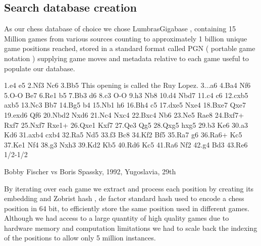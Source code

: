 \subsection{Search database creation}

As our chess database of choice we chose LumbrasGigabase \cite{retrieval:lumbrasgigabase}, containing 15 Million games from various sources counting
to approximately 1 billion unique game positions reached, stored in a standard format called PGN ( portable game notation ) \cite{chess:pgn} supplying 
game moves and metadata relative to each game useful to populate our database.
\newline

\begin{mdframed}
\newline
{}\newline
\string[Date "1992.11.04"]\string\newline
{}\newline
{}\newline
{}\newline
{}\newline
\newline
1.e4 e5 2.Nf3 Nc6 3.Bb5 {This opening is called the Ruy Lopez.} 3...a6
4.Ba4 Nf6 5.O-O Be7 6.Re1 b5 7.Bb3 d6 8.c3 O-O 9.h3 Nb8 10.d4 Nbd7
11.c4 c6 12.cxb5 axb5 13.Nc3 Bb7 14.Bg5 b4 15.Nb1 h6 16.Bh4 c5 17.dxe5
Nxe4 18.Bxe7 Qxe7 19.exd6 Qf6 20.Nbd2 Nxd6 21.Nc4 Nxc4 22.Bxc4 Nb6
23.Ne5 Rae8 24.Bxf7+ Rxf7 25.Nxf7 Rxe1+ 26.Qxe1 Kxf7 27.Qe3 Qg5 28.Qxg5
hxg5 29.b3 Ke6 30.a3 Kd6 31.axb4 cxb4 32.Ra5 Nd5 33.f3 Bc8 34.Kf2 Bf5
35.Ra7 g6 36.Ra6+ Kc5 37.Ke1 Nf4 38.g3 Nxh3 39.Kd2 Kb5 40.Rd6 Kc5 41.Ra6
Nf2 42.g4 Bd3 43.Re6 1/2-1/2
\end{mdframed}
\begin{center}
Bobby Fischer vs Boris Spassky, 1992, Yugoslavia, 29th
\end{center}
By iterating over each game we extract and process each position by creating its embedding and Zobrist hash \cite{retrieval:zobristhash}, de factor standard 
hash used to encode a chess position in 64 bit, to efficiently store the same position used in different games. 
\newline
Although we had access to a large quantity of high quality games due to hardware memory and computation limitations 
we had to scale back the indexing of the positions to allow only 5 million instances.
